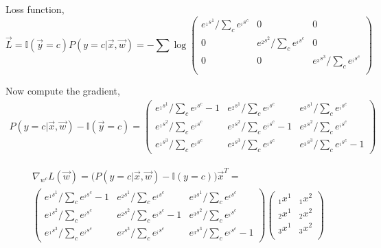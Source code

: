 \documentclass[12pt,a4paper]{article}%
\theoremstyle{definition}
\theoremstyle{plain}
\numberwithin{equation}{section}
\begin{document}
Loss function,
\begin{equation}
 \vec{L} = \mathbb{I}(\vec{y}=c)  P( y = c |  \vec{x}, \vec{w})  =  - \sum \log  \begin{pmatrix}
e^{{}_1s^{1}} /\sum\limits_{c} e^{{}_is^{c}}  &  0  & 0  \\
0 &  e^{{}_2s^{2}} /\sum\limits_{c} e^{{}_is^{c}}   & 0   \\
0 &  0  & e^{{}_3s^{3}}   /\sum\limits_{c} e^{{}_is^{c}}    \\
\end{pmatrix} 
\end{equation}

Now compute the gradient, 
\begin{gather}
P( y = c |  \vec{x}, \vec{w}) - \mathbb{I}(\vec{y}=c) =  \begin{pmatrix}
e^{{}_1s^{1}} /\sum\limits_{c} e^{{}_is^{c}} -1 &  e^{{}_2s^{1}}  /\sum\limits_{c} e^{{}_is^{c}}    &  e^{{}_3s^{1}}  /\sum\limits_{c} e^{{}_is^{c}} \\
e^{{}_1s^{2}} /\sum\limits_{c} e^{{}_is^{c}} & e^{{}_2s^{2}} /\sum\limits_{c} e^{{}_is^{c}}  -1  & e^{{}_3s^{2}} /\sum\limits_{c} e^{{}_is^{c}} \\
e^{{}_1s^{3}} /\sum\limits_{c} e^{{}_is^{c}} & e^{{}_2s^{3}}   /\sum\limits_{c} e^{{}_is^{c}}   & e^{{}_3s^{3}}   /\sum\limits_{c} e^{{}_is^{c}} -1
\end{pmatrix} 
\end{gather} 

\begin{gather}
\nabla_{ w^{c} } L(\vec{w})  =  \big(  P( y = c |  \vec{x}, \vec{w})  - \mathbb{I}(y=c)   \big)  \vec{x} ^{T}= \\
\begin{pmatrix}
e^{{}_1s^{1}} /\sum\limits_{c} e^{{}_is^{c}} -1 &  e^{{}_2s^{1}}  /\sum\limits_{c} e^{{}_is^{c}}    &  e^{{}_3s^{1}}  /\sum\limits_{c} e^{{}_is^{c}} \\
e^{{}_1s^{2}} /\sum\limits_{c} e^{{}_is^{c}} & e^{{}_2s^{2}} /\sum\limits_{c} e^{{}_is^{c}}  -1  & e^{{}_3s^{2}} /\sum\limits_{c} e^{{}_is^{c}} \\
e^{{}_1s^{3}} /\sum\limits_{c} e^{{}_is^{c}} & e^{{}_2s^{3}}   /\sum\limits_{c} e^{{}_is^{c}}   & e^{{}_3s^{3}}   /\sum\limits_{c} e^{{}_is^{c}} -1
\end{pmatrix} \begin{pmatrix}
{}_1x^{1}    & {}_1x^{2}  \\
 {}_2x^{1}   & {}_2x^{2}   \\
{}_3x^{1}    &  {}_3x^{2} \\
\end{pmatrix} 
\end{gather} 
\end{document}
